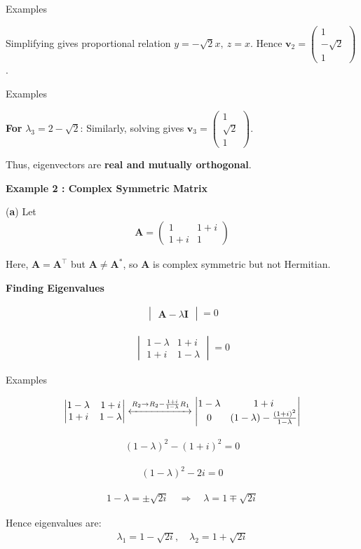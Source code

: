 \documentclass{beamer}
\numberwithin{equation}{section}
\theoremstyle{remark}
\newcommand{\myvec}[1]{\ensuremath{\begin{pmatrix}#1\end{pmatrix}}}
\newcommand{\mydet}[1]{\ensuremath{\begin{vmatrix}#1\end{vmatrix}}}
\let\vec\mathbf
\begin{document}
\begin{frame}{Examples}

Simplifying gives proportional relation $y = -\sqrt{2}x, \ z = x$.
Hence $\vec{v}_2 = \myvec{1\\-\sqrt{2}\\1}$.

\end{frame}

\begin{frame}{Examples}

\textbf{For } $\lambda_3 = 2-\sqrt{2}$:
Similarly, solving gives $\vec{v}_3 = \myvec{1\\\sqrt{2}\\1}$.

Thus, eigenvectors are \textbf{real and mutually orthogonal}.

\pagebreak

\textbf{Example 2 : Complex Symmetric Matrix}

(\textbf{a}) Let
\begin{align}
\vec{A} = \myvec{1 & 1+i\\ 1+i & 1}
\end{align}

Here, $\vec{A} = \vec{A}^\top$ but $\vec{A} \ne \vec{A}^*$, so $\vec{A}$ is complex symmetric but not Hermitian.

\textbf{Finding Eigenvalues}

\begin{align}
\mydet{\vec{A} - \lambda \vec{I}} = 0
\end{align}

\begin{align}
\mydet{
1-\lambda & 1+i\\
1+i & 1-\lambda
} = 0
\end{align}

\end{frame}

\begin{frame}{Examples}

\begin{align}
\mydet{
1-\lambda & 1+i\\
1+i & 1-\lambda
}
\xleftrightarrow{R_2 \to R_2 - \frac{1+i}{1-\lambda} R_1}
\mydet{
1-\lambda & 1+i\\
0 & (1-\lambda) - \frac{(1+i)^2}{1-\lambda}
}
\end{align}

\begin{align}
(1-\lambda)^2 - (1+i)^2 = 0
\end{align}

\begin{align}
(1-\lambda)^2 - 2i = 0
\end{align}

\begin{align}
1-\lambda = \pm \sqrt{2i} \quad \Rightarrow \quad \lambda = 1 \mp \sqrt{2i}
\end{align}

Hence eigenvalues are:
\begin{align}
\lambda_1 = 1 - \sqrt{2i}, \quad \lambda_2 = 1 + \sqrt{2i}
\end{align}

\end{frame}
\end{document}
